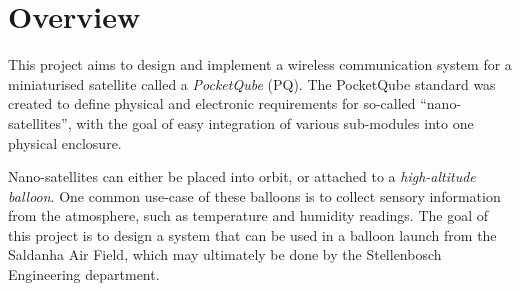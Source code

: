 \graphicspath{{./figures}}

\section{Overview}

This project aims to design and implement a wireless communication system for a miniaturised satellite called a \textit{PocketQube} (PQ). The PocketQube standard was created to define physical and electronic requirements for so-called ``nano-satellites'', with the goal of easy integration of various sub-modules into one physical enclosure.

Nano-satellites can either be placed into orbit, or attached to a \textit{high-altitude balloon}. One common use-case of these balloons is to collect sensory information from the atmosphere, such as temperature and humidity readings. The goal of this project is to design a system that can be used in a balloon launch from the Saldanha Air Field, which may ultimately be done by the Stellenbosch Engineering department.

